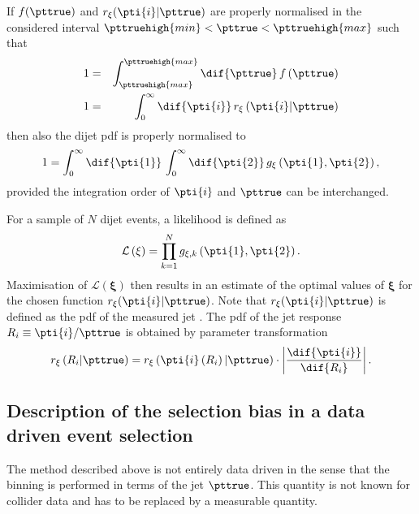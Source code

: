 If $f(\pttrue)$ and $r_{\mathbf{\xi}}(\pti{i}|\pttrue)$ are properly normalised in the considered interval \mbox{$\pttruehigh{min} < \pttrue < \pttruehigh{max}$} such that
\begin{eqnarray*}
  1 & = & \int^{\pttruehigh{max}}_{\pttruehigh{max}}\dif{\pttrue}\,f\left(\pttrue\right) \\
  1 & = & \int^{\infty}_{0}\dif{\pti{i}}\,r_{\mathbf{\xi}}\left(\pti{i}|\pttrue\right)
\end{eqnarray*}
then also the dijet pdf is properly normalised to
\begin{equation*}
  1 = \int^{\infty}_{0}\dif{\pti{1}}\,\int^{\infty}_{0}\dif{\pti{2}}\, g_{\mathbf{\xi}}\left(\pti{1},\pti{2}\right),
\end{equation*}
provided the integration order of $\pti{i}$ and $\pttrue$ can be interchanged.

For a sample of $N$ dijet events, a likelihood is defined as
\begin{equation}
  \label{eq:ResFit:Likelihood}
  \mathcal{L}\left(\mathbf{\xi}\right) = \prod^{N}_{k=1} g_{\mathbf{\xi},k}\left(\pti{1},\pti{2}\right).
\end{equation}
Maximisation of $\mathcal{L}(\mathbf{\xi})$ then results in an
estimate of the optimal values of $\mathbf{\xi}$ for the chosen
function $r_{\mathbf{\xi}}(\pti{i}|\pttrue)$.
Note that $r_{\mathbf{\xi}}(\pti{i}|\pttrue)$ is defined as the
pdf of the measured jet \pt.
The pdf of the jet \pt response \mbox{$R_{i}\equiv\pti{i} / \pttrue$} is obtained by parameter transformation
\begin{equation*}
  r_{\mathbf{\xi}}\left(R_{i}|\pttrue\right) =
  r_{\mathbf{\xi}}\left(\pti{i}\left(R_{i}\right)|\pttrue\right)\cdot\left|\frac{\dif{\pti{i}}}{\dif{R_{i}}}\right|.
\end{equation*}




\subsection{Description of the selection bias in a data driven event selection}\label{sec:ResFit:Method:Biases}

The method described above is not entirely data driven in the sense that the binning is performed in terms
of the jet $\pttrue$.
This quantity is not known for collider data and has to be replaced by a measurable quantity. 

